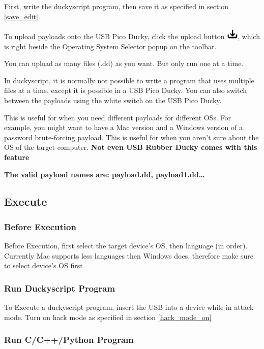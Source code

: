 \documentclass[a4paper,12pt]{article}
\begin{document}
First, write the duckyscript program, then save it as specified in section \ref{save_edit}.

To upload payloads onto the USB Pico Ducky, click the upload button \includegraphics[width=5.5mm]{pictures/white_bk/upload.png}, which is right beside the Operating System Selector popup on the toolbar.

You can upload as many files (.dd) as you want. But only run one at a time.

In duckyscript, it is normally not possible to write a program that uses multiple files at a time, except it is possible in a USB Pico Ducky. You can also switch between the payloads using the white switch on the USB Pico Ducky.

This is useful for when you need different payloads for different OSs. For example, you might want to have a Mac version and a Windows version of a password brute-forcing payload. This is useful for when you aren't sure about the OS of the target computer. \textbf{Not even USB Rubber Ducky comes with this feature}

\textbf{The valid payload names are: payload.dd, payload1.dd\dots}

\subsection{Execute}

\subsubsection{Before Execution}

Before Execution, first select the target device's OS, then language (in order). Currently Mac supports less languages then Windows does, therefore make sure to select device's OS first

\subsubsection{Run Duckyscript Program}

To Execute a duckyscript program, insert the USB into a device while in attack mode. Turn on hack mode as specified in section \ref{hack_mode_on}

\subsubsection{Run C/C++/Python Program}
\end{document}

